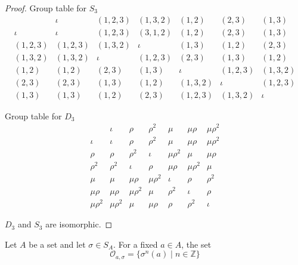 \begin{proof}
    Group table for $S_{3}$
    \[
        \begin{array}{c|cccccc}
                      & \iota     & (1, 2, 3) & (1, 3, 2) & (1, 2)    & (2, 3)    & (1, 3)    \\
            \hline
            \iota     & \iota     & (1, 2, 3) & (3, 1, 2) & (1, 2)    & (2, 3)    & (1, 3)    \\
            (1, 2, 3) & (1, 2, 3) & (1, 3, 2) & \iota     & (1, 3)    & (1, 2)    & (2, 3)    \\
            (1, 3, 2) & (1, 3, 2) & \iota     & (1, 2, 3) & (2, 3)    & (1, 3)    & (1, 2)    \\
            (1, 2)    & (1, 2)    & (2, 3)    & (1, 3)    & \iota     & (1, 2, 3) & (1, 3, 2) \\
            (2, 3)    & (2, 3)    & (1, 3)    & (1, 2)    & (1, 3, 2) & \iota     & (1, 2, 3) \\
            (1, 3)    & (1, 3)    & (1, 2)    & (2, 3)    & (1, 2, 3) & (1, 3, 2) & \iota
        \end{array}
    \]

    Group table for $D_{3}$
    \[
        \begin{array}{c|cccccc}
                        & \iota       & \rho        & \rho^{2}    & \mu         & \mu\rho     & \mu\rho^{2} \\
            \hline
            \iota       & \iota       & \rho        & \rho^{2}    & \mu         & \mu\rho     & \mu\rho^{2} \\
            \rho        & \rho        & \rho^{2}    & \iota       & \mu\rho^{2} & \mu         & \mu\rho     \\
            \rho^{2}    & \rho^{2}    & \iota       & \rho        & \mu\rho     & \mu\rho^{2} & \mu         \\
            \mu         & \mu         & \mu\rho     & \mu\rho^{2} & \iota       & \rho        & \rho^{2}    \\
            \mu\rho     & \mu\rho     & \mu\rho^{2} & \mu         & \rho^{2}    & \iota       & \rho        \\
            \mu\rho^{2} & \mu\rho^{2} & \mu         & \mu\rho     & \rho        & \rho^{2}    & \iota
        \end{array}
    \]

    $D_{3}$ and $S_{3}$ are isomorphic.
\end{proof}

Let $A$ be a set and let $\sigma\in S_{A}$. For a fixed $a\in A$, the set
\[
    \mathcal{O}_{a,\sigma} = \{ \sigma^{n}(a) \mid n\in\mathbb{Z} \}
\]

